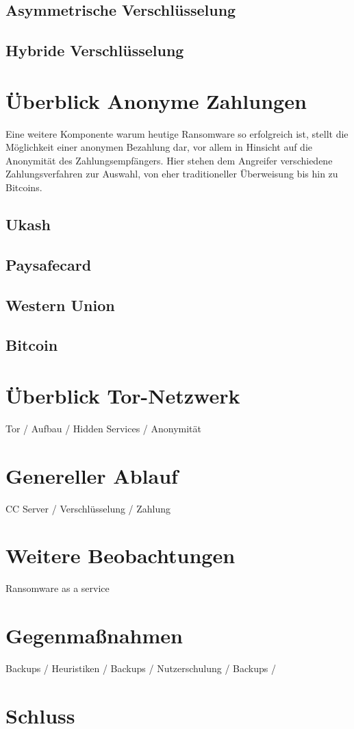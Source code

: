 \subsection{Asymmetrische Verschlüsselung}
\label{sec:asym_verschl}



\subsection{Hybride Verschlüsselung}
\label{sec:hybride_verschl}




\section{Überblick Anonyme Zahlungen}
Eine weitere Komponente warum heutige Ransomware so erfolgreich ist, stellt die Möglichkeit einer anonymen Bezahlung dar, vor allem in Hinsicht auf die Anonymität des Zahlungsempfängers. Hier stehen dem Angreifer verschiedene Zahlungsverfahren zur Auswahl, von eher traditioneller Überweisung bis hin zu Bitcoins.

\subsection{Ukash}
\subsection{Paysafecard}
\subsection{Western Union}
\subsection{Bitcoin}

\section{Überblick Tor-Netzwerk}
	Tor / Aufbau / Hidden Services / Anonymität

\section{Genereller Ablauf}
 CC Server / Verschlüsselung / Zahlung

\section{Weitere Beobachtungen}
Ransomware as a service

\section{Gegenmaßnahmen}
 
Backups / Heuristiken / Backups / Nutzerschulung / Backups / 

\section{Schluss}


